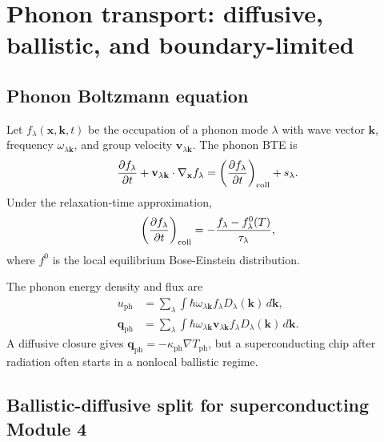 \documentclass[11pt]{article}
\newcommand{\Tph}{T_{\mathrm{ph}}}
\newcommand{\kappaph}{\kappa_{\mathrm{ph}}}
\newcommand{\x}{\mathbf{x}}
\newcommand{\Jph}{\mathbf{q}_{\mathrm{ph}}}
\begin{document}
\section{Phonon transport: diffusive, ballistic, and boundary-limited}

\subsection{Phonon Boltzmann equation}

Let \(f_\lambda(\x,\mathbf{k},t)\) be the occupation of a phonon mode \(\lambda\) with wave vector \(\mathbf{k}\), frequency \(\omega_{\lambda\mathbf{k}}\), and group velocity \(\mathbf{v}_{\lambda\mathbf{k}}\). The phonon BTE is
\begin{equation}
\pdv{f_\lambda}{t}+\mathbf{v}_{\lambda\mathbf{k}}\cdot\nabla_{\x} f_\lambda
=\left(\pdv{f_\lambda}{t}\right)_{\mathrm{coll}}+s_\lambda.
\label{eq:phonon_bte}
\end{equation}
Under the relaxation-time approximation,
\begin{equation}
\left(\pdv{f_\lambda}{t}\right)_{\mathrm{coll}}=-\frac{f_\lambda-f_\lambda^{0}(T)}{\tau_\lambda},
\label{eq:phonon_rta}
\end{equation}
where \(f^0\) is the local equilibrium Bose-Einstein distribution.

The phonon energy density and flux are
\begin{align}
u_{\mathrm{ph}} &= \sum_\lambda \int \hbar\omega_{\lambda\mathbf{k}} f_\lambda D_\lambda(\mathbf{k})\,d\mathbf{k},\\
\Jph &= \sum_\lambda \int \hbar\omega_{\lambda\mathbf{k}} \mathbf{v}_{\lambda\mathbf{k}} f_\lambda D_\lambda(\mathbf{k})\,d\mathbf{k}.
\end{align}
A diffusive closure gives \(\Jph=-\kappaph\nabla\Tph\), but a superconducting chip after radiation often starts in a nonlocal ballistic regime.

\subsection{Ballistic-diffusive split for superconducting Module 4}
\end{document}
